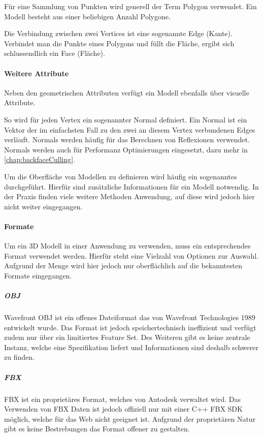 Für eine Sammlung von Punkten wird generell der Term Polygon verwendet.
Ein Modell besteht aus einer beliebigen Anzahl Polygone.

Die Verbindung zwischen zwei Vertices ist eine sogenannte Edge (Kante).
Verbindet man die Punkte eines Polygons und füllt die Fläche, ergibt sich schlussendlich ein Face (Fläche).

\paragraph{Weitere Attribute}
Neben den geometrischen Attributen verfügt ein Modell ebenfalls über visuelle Attribute.

So wird für jeden Vertex ein sogenannter Normal definiert. Ein Normal ist ein Vektor der im einfachsten Fall  zu den zwei an diesem Vertex verbundenen Edges verläuft. Normals werden häufig für das Berechnen von Reflexionen verwendet.
Normals werden auch für Performanz Optimierungen eingesetzt, dazu mehr in \autoref{chap:backfaceCulling}.

Um die Oberfläche von Modellen zu definieren wird häufig ein sogenanntes  durchgeführt. Hierfür sind zusätzliche Informationen für ein Modell notwendig. In der Praxis finden viele weitere Methoden Anwendung, auf diese wird jedoch hier nicht weiter eingegangen.

\paragraph{Formate}
Um ein 3D Modell in einer Anwendung zu verwenden, muss ein entsprechendes Format verwendet werden. Hierfür steht eine Vielzahl von Optionen zur Auswahl. Aufgrund der Menge wird hier jedoch nur oberflächlich auf die bekanntesten Formate eingegangen.

\subparagraph{OBJ}
Wavefront OBJ ist ein offenes Dateiformat das von Wavefront Technologies 1989 entwickelt wurde. Das Format ist jedoch speichertechnisch ineffizient und verfügt zudem nur über ein limitiertes Feature Set. Des Weiteren gibt es keine zentrale Instanz, welche eine Spezifikation liefert und Informationen sind deshalb schwerer zu finden. \cite{objSpec}

\subparagraph{FBX}
FBX ist ein proprietäres Format, welches von Autodesk verwaltet wird. Das Verwenden von FBX Daten ist jedoch offiziell nur mit einer C++ FBX SDK möglich, welche für das Web nicht geeignet ist. Aufgrund der proprietären Natur gibt es keine Bestrebungen das Format offener zu gestalten.

